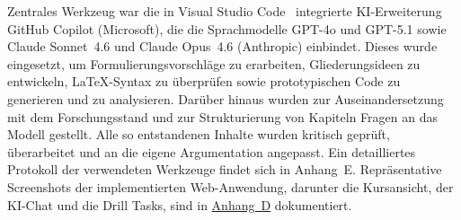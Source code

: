 Zentrales Werkzeug war die in Visual Studio Code~\cite{vscode} integrierte KI-Erweiterung GitHub Copilot (Microsoft), die die Sprachmodelle GPT-4o und GPT-5.1 sowie Claude Sonnet~4.6 und Claude Opus~4.6 (Anthropic) einbindet.
Dieses wurde eingesetzt, um Formulierungsvorschläge zu erarbeiten, Gliederungsideen zu entwickeln, \LaTeX-Syntax zu überprüfen sowie prototypischen Code zu generieren und zu analysieren.
Darüber hinaus wurden zur Auseinandersetzung mit dem Forschungsstand und zur Strukturierung von Kapiteln Fragen an das Modell gestellt.
Alle so entstandenen Inhalte wurden kritisch geprüft, überarbeitet und an die eigene Argumentation angepasst.
Ein detailliertes Protokoll der verwendeten Werkzeuge findet sich in Anhang~E.
Repräsentative Screenshots der implementierten Web-Anwendung, darunter die Kursansicht, der KI-Chat und die Drill Tasks, sind in \hyperref[appendix:daten]{Anhang~D} dokumentiert.



